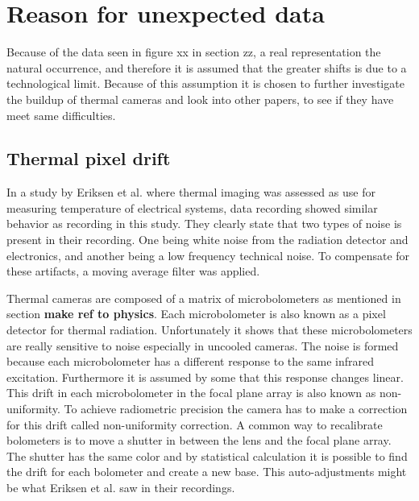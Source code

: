 \section{Reason for unexpected data}


Because of the data seen in figure xx in section zz, a real representation the natural occurrence, and therefore it is assumed that the greater shifts is due to a technological limit. Because of this assumption it is chosen to further investigate the buildup of thermal cameras and look into other papers, to see if they have meet same difficulties.

\subsection{Thermal pixel drift}

In a study by Eriksen et al. where thermal imaging was assessed as use for measuring temperature of electrical systems, data recording showed similar behavior as recording in this study. They clearly state that two types of noise is present in their recording. One being white noise from the radiation detector and electronics, and another being a low frequency technical noise. To compensate for these artifacts, a moving average filter was applied.\cite{eriksen2014}


Thermal cameras are composed of a matrix of microbolometers as mentioned in section \textbf{make ref to physics}. Each microbolometer is also known as a pixel detector for thermal radiation.\cite{olbrycht2015,wolf2016} Unfortunately it shows that these microbolometers are really sensitive to noise especially in uncooled cameras. The noise is formed because each microbolometer has a different response to the same infrared excitation. Furthermore it is assumed by some that this response changes linear\cite{olbrycht2015}. This drift in each microbolometer in the focal plane array is also known as non-uniformity. To achieve radiometric precision the camera has to make a correction for this drift called non-uniformity correction. A common way to recalibrate bolometers is to move a shutter in between the lens and the focal plane array. The shutter has the same color and by statistical calculation it is possible to find the drift for each bolometer and create a new base.\cite{olbrycht2015,wolf2016} This auto-adjustments might be what Eriksen et al. saw in their recordings. 




